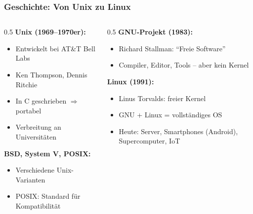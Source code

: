 \documentclass[aspectratio=169]{beamer}
\begin{document}
\begin{frame}
  \frametitle{Geschichte: Von Unix zu Linux}
  \begin{columns}[T]
    \begin{column}{0.5\textwidth}
      \textbf{Unix (1969--1970er):}
      \begin{itemize}
        \item Entwickelt bei AT\&T Bell Labs
        \item Ken Thompson, Dennis Ritchie
        \item In C geschrieben $\Rightarrow$ portabel
        \item Verbreitung an Universitäten
      \end{itemize}
      \vspace{3mm}
      \textbf{BSD, System V, POSIX:}
      \begin{itemize}
        \item Verschiedene Unix-Varianten
        \item POSIX: Standard für Kompatibilität
      \end{itemize}
    \end{column}
    \begin{column}{0.5\textwidth}
      \textbf{GNU-Projekt (1983):}
      \begin{itemize}
        \item Richard Stallman: ``Freie Software''
        \item Compiler, Editor, Tools -- aber kein Kernel
      \end{itemize}
      \vspace{3mm}
      \textbf{Linux (1991):}
      \begin{itemize}
        \item Linus Torvalds: freier Kernel
        \item GNU + Linux = vollständiges OS
        \item Heute: Server, Smartphones (Android), Supercomputer, IoT
      \end{itemize}
    \end{column}
  \end{columns}
\end{frame}
\end{document}

